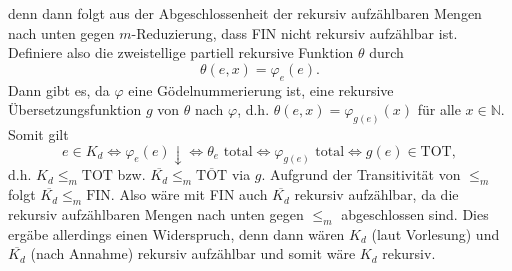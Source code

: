 \documentclass[german,headsepline]{scrartcl}
\theoremstyle{definition}
\begin{document}
\begin{solution}
\begin{enumerate}[(a)]
				denn dann folgt aus der Abgeschlossenheit der rekursiv aufzählbaren Mengen nach unten gegen $m$-Reduzierung,
				dass FIN nicht rekursiv aufzählbar ist.
				Definiere also die zweistellige partiell rekursive Funktion $\theta$ durch
				\[\theta(e,x)=\varphi_e(e).\]
				Dann gibt es, da $\varphi$ eine Gödelnummerierung ist,
				eine rekursive Übersetzungsfunktion $g$ von $\theta$ nach $\varphi$,
				d.h. $\theta(e,x)=\varphi_{g(e)}(x)$ für alle $x\in\mathbb{N}$.
				Somit gilt \[
					e\in K_d
					\Leftrightarrow\varphi_e(e)\downarrow
					\Leftrightarrow\theta_e\text{ total}
					\Leftrightarrow\varphi_{g(e)}\text{ total}
					\Leftrightarrow g(e)\in\text{TOT},
				\]
				d.h. $K_d\leq_m\text{TOT}$ bzw. $\overline{K_d}\leq_m\overline{\text{TOT}}$ via $g$.
				Aufgrund der Transitivität von $\leq_m$ folgt $\overline{K_d}\leq_m\text{FIN}$.
				Also wäre mit FIN auch $\overline{K_d}$ rekursiv aufzählbar,
				da die rekursiv aufzählbaren Mengen nach unten gegen $\leq_m$ abgeschlossen sind.
				Dies ergäbe allerdings einen Widerspruch,
				denn dann wären $K_d$ (laut Vorlesung) und $\overline{K_d}$ (nach Annahme) rekursiv aufzählbar und somit wäre $K_d$ rekursiv.
		\end{enumerate}
	\end{solution}
	
\end{document}
